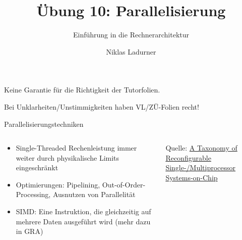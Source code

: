 \documentclass[
  german,            %
  aspectratio=169,    %
]{tumbeamer}
\title{Übung 10: Parallelisierung}
\subtitle{Einführung in die Rechnerarchitektur}
\author{Niklas Ladurner}
\institute{\theChairName\\\theDepartmentName\\\theUniversityName}
\date{\DTMdisplaydate{2025}{01}{03}{-1}}
\begin{document}
\maketitle

\begin{frame}[c, fragile]{}{}
	\begin{center}
		\LARGE  Keine Garantie für die Richtigkeit der Tutorfolien.

		\Large Bei Unklarheiten/Unstimmigkeiten haben VL/ZÜ-Folien recht!
	\end{center}
\end{frame}

\begin{frame}[c, fragile]{Parallelisierungstechniken}{}
	\begin{columns}[c]
		\begin{column}{0.5\textwidth}
			\begin{itemize}
				\item Single-Threaded Rechenleistung immer weiter durch physikalische Limits eingeschränkt
				\item Optimierungen: Pipelining, Out-of-Order-Processing, Ausnutzen von Parallelität
				\item SIMD: Eine Instruktion, die gleichzeitig auf mehrere Daten ausgeführt wird (mehr dazu in GRA)

			\end{itemize}
		\end{column}
		\begin{column}{0.5\textwidth}
			\begin{center}
			\end{center}
			\centering
			\tiny{Quelle: \href{https://www.researchgate.net/publication/26639095_A_Taxonomy_of_Reconfigurable_Single-Multiprocessor_Systems-on-Chip}{A Taxonomy of Reconfigurable Single-/Multiprocessor\\Systems-on-Chip}}
		\end{column}
	\end{columns}
\end{frame}
\end{document}
